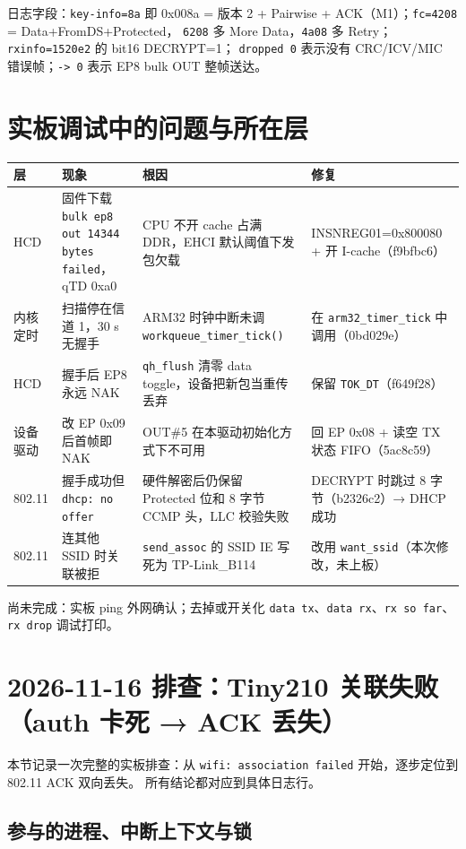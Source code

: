 \documentclass[UTF8,zihao=-4,fontset=none]{ctexart}
\newcommand{\fn}[1]{\texttt{#1}}
\begin{document}
日志字段：\fn{key-info=8a} 即 0x008a = 版本 2 + Pairwise + ACK（M1）；\fn{fc=4208} = Data+FromDS+Protected，
\fn{6208} 多 More Data，\fn{4a08} 多 Retry；\fn{rxinfo=1520e2} 的 bit16 DECRYPT=1；
\fn{dropped 0} 表示没有 CRC/ICV/MIC 错误帧；\fn{-> 0} 表示 EP8 bulk OUT 整帧送达。

\section{实板调试中的问题与所在层}\label{sec:bugs}

\begin{longtable}{p{14mm}p{40mm}p{52mm}p{42mm}}
\toprule
层 & 现象 & 根因 & 修复 \\ \midrule \endhead
HCD & 固件下载 \fn{bulk ep8 out 14344 bytes failed}，qTD 0xa0 & CPU 不开 cache 占满 DDR，EHCI 默认阈值下发包欠载 & INSNREG01=0x800080 + 开 I-cache（f9bfbc6） \\
内核定时 & 扫描停在信道 1，30 s 无握手 & ARM32 时钟中断未调 \fn{workqueue\_timer\_tick()} & 在 \fn{arm32\_timer\_tick} 中调用（0bd029e） \\
HCD & 握手后 EP8 永远 NAK & \fn{qh\_flush} 清零 data toggle，设备把新包当重传丢弃 & 保留 \fn{TOK\_DT}（f649f28） \\
设备驱动 & 改 EP 0x09 后首帧即 NAK & OUT\#5 在本驱动初始化方式下不可用 & 回 EP 0x08 + 读空 TX 状态 FIFO（5ac8c59） \\
802.11 & 握手成功但 \fn{dhcp: no offer} & 硬件解密后仍保留 Protected 位和 8 字节 CCMP 头，LLC 校验失败 & DECRYPT 时跳过 8 字节（b2326c2）→ DHCP 成功 \\
802.11 & 连其他 SSID 时关联被拒 & \fn{send\_assoc} 的 SSID IE 写死为 TP-Link\_B114 & 改用 \fn{want\_ssid}（本次修改，未上板） \\
\bottomrule
\end{longtable}

尚未完成：实板 ping 外网确认；去掉或开关化 \fn{data tx}、\fn{data rx}、\fn{rx so far}、\fn{rx drop} 调试打印。


\section{2026-11-16 排查：Tiny210 关联失败（auth 卡死 → ACK 丢失）}\label{sec:assoc-debug}

本节记录一次完整的实板排查：从 \fn{wifi: association failed} 开始，逐步定位到 802.11 ACK 双向丢失。
所有结论都对应到具体日志行。

\subsection{参与的进程、中断上下文与锁}
\end{document}
